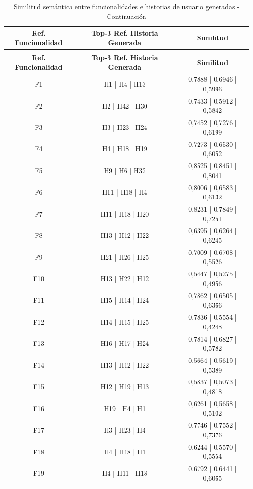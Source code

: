 \documentclass{prgrado}
\begin{document}
\begin{longtable}{|c|c|c|}
\caption{Similitud semántica entre funcionalidades e historias de usuario generadas}
\label{tab:fun_historias_generadas}\\
\hline
\textbf{Ref. Funcionalidad} & \textbf{Top-3 Ref. Historia Generada} & \textbf{Similitud} \\
\hline
\endfirsthead

\caption{Similitud semántica entre funcionalidades e historias de usuario generadas - Continuación} \\
\hline
\textbf{Ref. Funcionalidad} & \textbf{Top-3 Ref. Historia Generada} & \textbf{Similitud} \\
\hline
\endhead

F1  & H1 | H4 | H13 & 0,7888 | 0,6946 | 0,5996 \\ \hline
F2  & H2 | H42 | H30 & 0,7433 | 0,5912 | 0,5842 \\ \hline
F3  & H3 | H23 | H24 & 0,7452 | 0,7276 | 0,6199 \\ \hline
F4  & H4 | H18 | H19 & 0,7273 | 0,6530 | 0,6052 \\ \hline
F5  & H9 | H6 | H32 & 0,8525 | 0,8451 | 0,8041 \\ \hline
F6  & H11 | H18 | H4 & 0,8006 | 0,6583 | 0,6132 \\ \hline
F7  & H11 | H18 | H20 & 0,8231 | 0,7849 | 0,7251 \\ \hline
F8  & H13 | H12 | H22 & 0,6395 | 0,6264 | 0,6245 \\ \hline
F9  & H21 | H26 | H25 & 0,7009 | 0,6708 | 0,5526 \\ \hline
F10 & H13 | H22 | H12 & 0,5447 | 0,5275 | 0,4956 \\ \hline
F11 & H15 | H14 | H24 & 0,7862 | 0,6505 | 0,6366 \\ \hline
F12 & H14 | H15 | H25 & 0,7836 | 0,5554 | 0,4248 \\ \hline
F13 & H16 | H17 | H24 & 0,7814 | 0,6827 | 0,5782 \\ \hline
F14 & H13 | H12 | H22 & 0,5664 | 0,5619 | 0,5389 \\ \hline
F15 & H12 | H19 | H13 & 0,5837 | 0,5073 | 0,4818 \\ \hline
F16 & H19 | H4 | H1 & 0,6261 | 0,5658 | 0,5102 \\ \hline
F17 & H3 | H23 | H4 & 0,7746 | 0,7552 | 0,7376 \\ \hline
F18 & H4 | H18 | H1 & 0,6244 | 0,5570 | 0,5554 \\ \hline
F19 & H4 | H11 | H18 & 0,6792 | 0,6441 | 0,6065 \\ \hline

\end{longtable}
\end{document}
